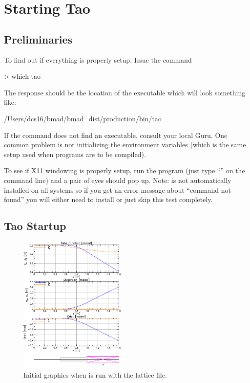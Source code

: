 \documentclass{hitec}     %
\newcommand{\Section}[1]{\section{#1}\vspace*{-1ex}}
\begin{document}
\newpage

\Section{Starting Tao}
\label{s:start}

\subsection{Preliminaries}

To find out if everything is properly setup. Issue the command
\begin{code}
> which tao
\end{code}
The response should be the location of the \tao executable which will look something like:
\begin{code}
/Users/dcs16/bmad/bmad_dist/production/bin/tao
\end{code}
If the  command does not find an executable, consult your local \bmad Guru. One common
problem is not initializing the \bmad environment variables (which is the same setup used when
programs are to be compiled).

To see if X11 windowing is properly setup, run the  program (just type ``'' on
the command line) and a pair of eyes should pop up. Note:  is not automatically installed
on all systems so if you get an error message about ``command not found'' you will either need to
install  or just skip this test completely.

\subsection{Tao Startup}
\label{s:tao.run}

\begin{figure}[tb]
  \centering
  \includegraphics[width=0.47\textwidth]{lat-init.pdf}
  \caption{Initial graphics when \tao is run with the  lattice file.}
  \label{f:init.graph}
\end{figure}
\end{document}
